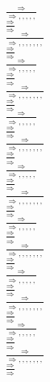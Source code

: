 \documentclass[11pt]{article}
\begin{document}
\begin{center}
\\$\frac{\Rightarrow }{\Rightarrow , , , , , }$
\bigskip
\\$\frac{\Rightarrow }{\Rightarrow }$
\bigskip
\\$\frac{\Rightarrow }{\Rightarrow , , , , , , , }$
\bigskip
\\$\frac{\Rightarrow }{\Rightarrow }$
\bigskip
\\$\frac{\Rightarrow }{\Rightarrow , , , , , }$
\bigskip
\\$\frac{\Rightarrow }{\Rightarrow }$
\bigskip
\\$\frac{\Rightarrow }{\Rightarrow , , , , , , , }$
\bigskip
\\$\frac{\Rightarrow }{\Rightarrow }$
\bigskip
\\$\frac{\Rightarrow }{\Rightarrow , , , , , }$
\bigskip
\\$\frac{\Rightarrow }{\Rightarrow }$
\bigskip
\\$\frac{\Rightarrow }{\Rightarrow , , , , , , , }$
\bigskip
\\$\frac{\Rightarrow }{\Rightarrow }$
\bigskip
\\$\frac{\Rightarrow }{\Rightarrow , , , , , }$
\bigskip
\\$\frac{\Rightarrow }{\Rightarrow }$
\bigskip
\\$\frac{\Rightarrow }{\Rightarrow , , , , , , , }$
\bigskip
\\$\frac{\Rightarrow }{\Rightarrow }$
\bigskip
\\$\frac{\Rightarrow }{\Rightarrow , , , , , }$
\bigskip
\\$\frac{\Rightarrow }{\Rightarrow }$
\bigskip
\\$\frac{\Rightarrow }{\Rightarrow , , , , , , , }$
\bigskip
\\$\frac{\Rightarrow }{\Rightarrow }$
\bigskip
\\$\frac{\Rightarrow }{\Rightarrow , , , , , }$
\bigskip
\\$\frac{\Rightarrow }{\Rightarrow }$
\bigskip
\\$\frac{\Rightarrow }{\Rightarrow , , , , , , , }$
\bigskip
\\$\frac{\Rightarrow }{\Rightarrow }$
\bigskip
\\$\frac{\Rightarrow }{\Rightarrow , , , , , }$
\bigskip
\\$\frac{\Rightarrow }{\Rightarrow }$
\bigskip
\\$\frac{\Rightarrow }{\Rightarrow , , , , , , , }$
\bigskip
\\$\frac{\Rightarrow }{\Rightarrow }$
\bigskip

\end{center}
\end{document}
